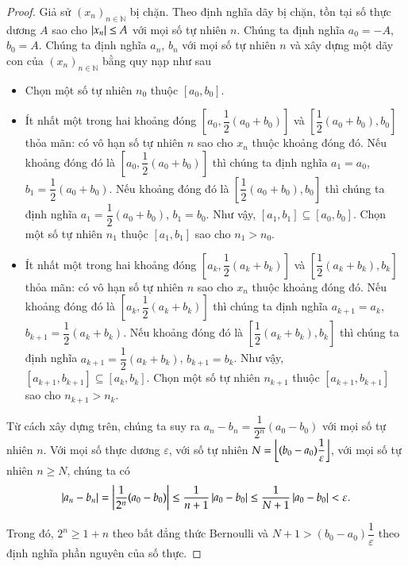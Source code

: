 \begin{proof}
    Giả sử ${(x_{n})}_{n\in\mathbb{N}}$ bị chặn. Theo định nghĩa dãy bị chặn, tồn tại số thực dương $A$ sao cho $\left\vert{x_{n}}\right\vert\leq A$ với mọi số tự nhiên $n$. Chúng ta định nghĩa $a_{0} = -A$, $b_{0} = A$. Chúng ta định nghĩa $a_{n}$, $b_{n}$ với mọi số tự nhiên $n$ và xây dựng một dãy con của ${(x_{n})}_{n\in\mathbb{N}}$ bằng quy nạp như sau
    \begin{itemize}
        \item Chọn một số tự nhiên $n_{0}$ thuộc $[a_{0}, b_{0}]$.
        \item Ít nhất một trong hai khoảng đóng $\left[a_{0}, \dfrac{1}{2}(a_{0}+b_{0})\right]$ và $\left[\dfrac{1}{2}(a_{0}+b_{0}), b_{0}\right]$ thỏa mãn: có vô hạn số tự nhiên $n$ sao cho $x_{n}$ thuộc khoảng đóng đó. Nếu khoảng đóng đó là $\left[a_{0}, \dfrac{1}{2}(a_{0}+b_{0})\right]$ thì chúng ta định nghĩa $a_{1} = a_{0}$, $b_{1} = \dfrac{1}{2}(a_{0} + b_{0})$. Nếu khoảng đóng đó là $\left[\dfrac{1}{2}(a_{0}+b_{0}), b_{0}\right]$ thì chúng ta định nghĩa $a_{1} = \dfrac{1}{2}(a_{0} + b_{0})$, $b_{1} = b_{0}$. Như vậy, $[a_{1}, b_{1}]\subseteq [a_{0}, b_{0}]$. Chọn một số tự nhiên $n_{1}$ thuộc $[a_{1}, b_{1}]$ sao cho $n_{1} > n_{0}$.
        \item Ít nhất một trong hai khoảng đóng $\left[a_{k}, \dfrac{1}{2}(a_{k}+b_{k})\right]$ và $\left[\dfrac{1}{2}(a_{k}+b_{k}), b_{k}\right]$ thỏa mãn: có vô hạn số tự nhiên $n$ sao cho $x_{n}$ thuộc khoảng đóng đó. Nếu khoảng đóng đó là $\left[a_{k}, \dfrac{1}{2}(a_{k}+b_{k})\right]$ thì chúng ta định nghĩa $a_{k+1} = a_{k}$, $b_{k+1} = \dfrac{1}{2}(a_{k} + b_{k})$. Nếu khoảng đóng đó là $\left[\dfrac{1}{2}(a_{k}+b_{k}), b_{k}\right]$ thì chúng ta định nghĩa $a_{k+1} = \dfrac{1}{2}(a_{k} + b_{k})$, $b_{k+1} = b_{k}$. Như vậy, $[a_{k+1}, b_{k+1}]\subseteq [a_{k}, b_{k}]$. Chọn một số tự nhiên $n_{k+1}$ thuộc $[a_{k+1}, b_{k+1}]$ sao cho $n_{k+1} > n_{k}$.
    \end{itemize}

    Từ cách xây dựng trên, chúng ta suy ra $a_{n} - b_{n} = \dfrac{1}{2^{n}}(a_{0} - b_{0})$ với mọi số tự nhiên $n$. Với mọi số thực dương $\varepsilon$, với số tự nhiên $N = \left\lfloor{(b_{0} - a_{0})\dfrac{1}{\varepsilon}}\right\rfloor$, với mọi số tự nhiên $n\geq N$, chúng ta có
    \[
        \left\vert{a_{n} - b_{n}}\right\vert = \left\vert{\frac{1}{2^{n}}(a_{0} - b_{0})}\right\vert\leq \frac{1}{n+1}\left\vert{a_{0} - b_{0}}\right\vert\leq \frac{1}{N+1}\left\vert{a_{0} - b_{0}}\right\vert < \varepsilon.
    \]

    Trong đó, $2^{n}\geq 1 + n$ theo bất đẳng thức Bernoulli và $N + 1 > (b_{0} - a_{0})\dfrac{1}{\varepsilon}$ theo định nghĩa phần nguyên của số thực.


\end{proof}
